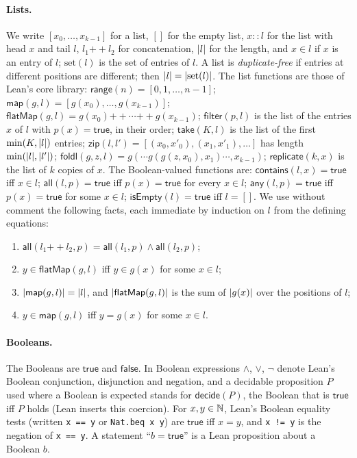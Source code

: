 \paragraph{Lists.} We write $[x_0,\dots,x_{k-1}]$ for a list, $[]$ for the empty list, $x\mathbin{::}l$ for the list
with head $x$ and tail $l$, $l_1\mathbin{+\!\!+}l_2$ for concatenation, $\lvert l\rvert$ for the length, and $x\in l$ if $x$
is an entry of $l$; $\mathrm{set}(l)$ is the set of entries of $l$. A list is \emph{duplicate-free} if entries at
different positions are different; then $\lvert l\rvert=\lvert\mathrm{set}(l)\rvert$. The list functions are those of Lean's core
library: $\mathsf{range}(n)=[0,1,\dots,n-1]$; $\mathsf{map}(g,l)=[g(x_0),\dots,g(x_{k-1})]$;
$\mathsf{flatMap}(g,l)=g(x_0)\mathbin{+\!\!+}\cdots\mathbin{+\!\!+}g(x_{k-1})$; $\mathsf{filter}(p,l)$ is the list of
the entries $x$ of $l$ with $p(x)=\mathsf{true}$, in their order; $\mathsf{take}(K,l)$ is the list of the first
$\min(K,\lvert l\rvert)$ entries; $\mathsf{zip}(l,l')=[(x_0,x'_0),(x_1,x'_1),\dots]$ has length $\min(\lvert l\rvert,\lvert l'\rvert)$;
$\mathsf{foldl}(g,z,l)=g(\cdots g(g(z,x_0),x_1)\cdots,x_{k-1})$; $\mathsf{replicate}(k,x)$ is the list of $k$ copies of
$x$. The Boolean-valued functions are: $\mathsf{contains}(l,x)=\mathsf{true}$ iff $x\in l$;
$\mathsf{all}(l,p)=\mathsf{true}$ iff $p(x)=\mathsf{true}$ for every $x\in l$; $\mathsf{any}(l,p)=\mathsf{true}$ iff
$p(x)=\mathsf{true}$ for some $x\in l$; $\mathsf{isEmpty}(l)=\mathsf{true}$ iff $l=[]$. We use without comment the
following facts, each immediate by induction on $l$ from the defining equations:
\begin{enumerate}[label=(L\arabic*)]
\item $\mathsf{all}(l_1\mathbin{+\!\!+}l_2,p)=\mathsf{all}(l_1,p)\wedge\mathsf{all}(l_2,p)$;
\item $y\in\mathsf{flatMap}(g,l)$ iff $y\in g(x)$ for some $x\in l$;
\item $\lvert\mathsf{map}(g,l)\rvert=\lvert l\rvert$, and $\lvert\mathsf{flatMap}(g,l)\rvert$ is the sum of $\lvert g(x)\rvert$ over the
  positions of $l$;
\item $y\in\mathsf{map}(g,l)$ iff $y=g(x)$ for some $x\in l$.
\end{enumerate}

\paragraph{Booleans.} The Booleans are $\mathsf{true}$ and $\mathsf{false}$. In Boolean expressions $\wedge$, $\vee$,
$\neg$ denote Lean's Boolean conjunction, disjunction and negation, and a decidable proposition $P$ used where a Boolean
is expected stands for $\mathsf{decide}(P)$, the Boolean that is $\mathsf{true}$ iff $P$ holds (Lean inserts this
coercion). For $x,y\in\mathbb N$, Lean's Boolean equality tests (written \texttt{x == y} or \texttt{Nat.beq x y}) are
$\mathsf{true}$ iff $x=y$, and \texttt{x != y} is the negation of \texttt{x == y}. A statement ``$b=\mathsf{true}$'' is a
Lean proposition about a Boolean $b$.

